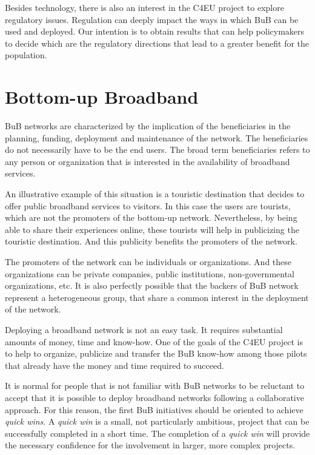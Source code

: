 \documentclass[conference]{IEEEtran}
\begin{document}
Besides technology, there is also an interest in the C4EU project to explore regulatory issues.
Regulation can deeply impact the ways in which BuB can be used and deployed.
Our intention is to obtain results that can help policymakers to decide which are the regulatory directions that lead to a greater benefit for the population.

\section{Bottom-up Broadband}
\label{sec:bub}

BuB networks are characterized by the implication of the beneficiaries in the planning, funding, deployment and maintenance of the network.
The beneficiaries do not necessarily have to be the end users.
The broad term beneficiaries refers to any person or organization that is interested in the availability of broadband services.

An illustrative example of this situation is a touristic destination that decides to offer public broadband services to visitors.
In this case the users are tourists, which are not the promoters of the bottom-up network.
Nevertheless, by being able to share their experiences online, these tourists will help in publicizing the touristic destination.
And this publicity benefits the promoters of the network.

The promoters of the network can be individuals or organizations.
And these organizations can be private companies, public institutions, non-governmental organizations, etc.  
It is also perfectly possible that the backers of BuB network represent a heterogeneous group, that share a common interest in the deployment of the network.

Deploying a broadband network is not an easy task.
It requires substantial amounts of money, time and know-how.
One of the goals of the C4EU project is to help to organize, publicize and transfer the  BuB know-how among those pilots that already have the money and time required to succeed.

It is normal for people that is not familiar with BuB networks to be reluctant to accept that it is possible to deploy broadband networks following a collaborative approach.
For this reason, the first BuB initiatives should be oriented to achieve \emph{quick wins}.
A \emph{quick win} is a small, not particularly ambitious, project that can be successfully completed in a short time.
The completion of a \emph{quick win} will provide the necessary confidence for the involvement in larger, more complex projects.
\end{document}
